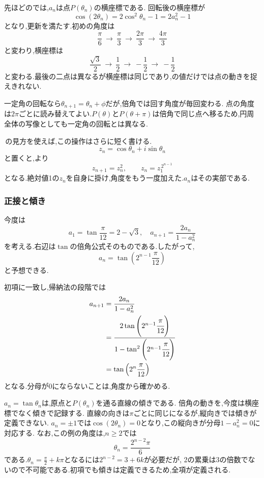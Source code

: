     先ほどのでは,$a_n$は点$P(\theta_n)$の横座標である.
    回転後の横座標が
    \[
      \cos(2\theta_n)=2\cos^2\theta_n-1=2a_n^2-1
    \]
    となり,更新を満たす.初めの角度は
    \[
      \frac{\pi}{6}\ \longrightarrow\ \frac{\pi}{3}
      \ \longrightarrow\ \frac{2\pi}{3}
      \ \longrightarrow\ \frac{4\pi}{3}
    \]
    と変わり,横座標は
    \[
      \frac{\sqrt{3}}{2}\ \longrightarrow\ \frac12
      \ \longrightarrow\ -\frac12
      \ \longrightarrow\ -\frac12
    \]
    と変わる.最後の二点は異なるが横座標は同じであり,の値だけでは点の動きを捉えきれない.

    一定角の回転なら$\theta_{n+1}=\theta_n+\phi$だが,倍角では回す角度が毎回変わる.
    点の角度は$2\pi$ごとに読み替えてよい.$P(\theta)$と$P(\theta+\pi)$は倍角で同じ点へ移るため,円周全体の写像としても一定角の回転とは異なる.

    \,の見方を使えば,この操作はさらに短く書ける.
    \[
      z_n=\cos\theta_n+i\sin\theta_n
    \]
    と置くと,より
    \[
      z_{n+1}=z_n^2,\qquad z_n=z_1^{\,2^{n-1}}
    \]
    となる.絶対値1の$z_n$を自身に掛け,角度をもう一度加えた.$a_n$はその実部である.

    \subsubsection{正接と傾き}\label{節：正接では直線の傾きを記録する}
    今度は
    \[
      a_1=\tan\frac{\pi}{12}=2-\sqrt{3},
      \quad
      a_{n+1}=\frac{2a_n}{1-a_n^2}
    \]
    を考える.右辺は$\tan$の倍角公式そのものである.したがって,
    \[
      a_n=\tan\left(2^{n-1}\frac{\pi}{12}\right)
    \]
    と予想できる.

    初項に一致し,帰納法の段階では
    \begin{align*}
      a_{n+1}
        &=\frac{2a_n}{1-a_n^2}\\
        &=\cfrac{2\tan\left(2^{n-1}\cfrac{\pi}{12}\right)}
                {1-\tan^2\left(2^{n-1}\cfrac{\pi}{12}\right)}\\
        &=\tan\left(2^n\frac{\pi}{12}\right)
    \end{align*}
    となる.分母が0にならないことは,角度から確かめる.

    $a_n=\tan\theta_n$は,原点と$P(\theta_n)$を通る直線の傾きである.
    倍角の動きを,今度は横座標でなく傾きで記録する.
    直線の向きは$\pi$ごとに同じになるが,縦向きでは傾きが定義できない.
    $a_n=\pm1$では$\cos(2\theta_n)=0$となり,この縦向きが分母$1-a_n^2=0$に対応する.
    なお,この例の角度は,$n\geq2$では
    \[
      \theta_n=\frac{2^{n-2}\pi}{6}
    \]
    である.$\displaystyle \theta_n=\frac{\pi}{2}+k\pi$となるには$2^{n-2}=3+6k$が必要だが,
    2の累乗は3の倍数でないので不可能である.初項でも傾きは定義できるため,全項が定義される.

